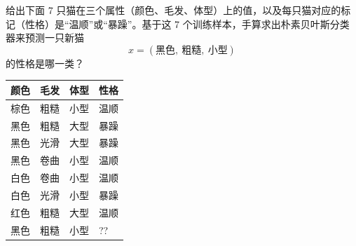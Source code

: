 \documentclass[11pt,letter,notitlepage]{ctexart}
\theoremstyle{definition}
\begin{document}
    \begin{exercise}[朴素贝叶斯分类器与新样本预测]
给出下面 7 只猫在三个属性（颜色、毛发、体型）上的值，以及每只猫对应的标记（性格）是“温顺”或“暴躁”。基于这 7 个训练样本，手算求出朴素贝叶斯分类器来预测一只新猫
\[
x=(\text{黑色},\ \text{粗糙},\ \text{小型})
\]
的性格是哪一类？

\begin{center}
\begin{tabular}{p{}p{}p{}p{}}
\toprule
\textbf{颜色} & \textbf{毛发} & \textbf{体型} & \textbf{性格} \\
\midrule
棕色 & 粗糙 & 小型 & 温顺 \\
黑色 & 粗糙 & 大型 & 暴躁 \\
黑色 & 光滑 & 大型 & 暴躁 \\
黑色 & 卷曲 & 小型 & 温顺 \\
白色 & 卷曲 & 小型 & 温顺 \\
白色 & 光滑 & 小型 & 暴躁 \\
红色 & 粗糙 & 大型 & 温顺 \\
\midrule
黑色 & 粗糙 & 小型 & ?? \\
\bottomrule
\end{tabular}
\end{center}
    \end{exercise}

\newpage

\begin{solution}
    
\end{solution}
\end{document}

